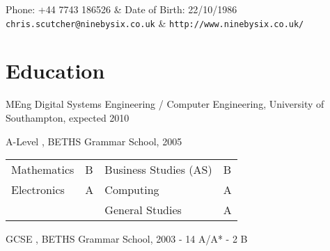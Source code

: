 \documentclass[overlapped,line,letterpaper]{res}
\begin{document}

\setlength{\leftmargini}{0em}
\setlength{\leftmargin}{1.5cm}
\setlength{\rightmargin}{1.5cm}
\setlength{\textheight}{800pt}
\setlength{\voffset}{-0.5in}
\renewcommand{\labelitemi}{}

\renewcommand{\namefont}{\large\textbf}



\begin{resume}

\begin{ncolumn}{2}  
  Phone: +44 7743 186526                & Date of Birth: 22/10/1986 \\		        
  {\tt chris.scutcher@ninebysix.co.uk}  & {\tt \verb+http://www.ninebysix.co.uk/+} 
\end{ncolumn}


\section{\bf Education}
MEng Digital Systems Engineering / Computer Engineering, University of 
Southampton, expected 2010

A-Level , BETHS Grammar School, 2005						\\ 
\hspace*{1cm} 
\begin{tabulary}{\textwidth}{p{4cm}p{0.5cm}p{4cm}p{0.5cm}}					   
Mathematics	&	B	&	Business Studies (AS)	&	B	\\ 
Electronics	&	A	&	Computing		&	A	\\ 
		&		&	General Studies		&	A	\\ 
\end{tabulary}

GCSE , BETHS Grammar School, 2003	- 14 A/A* - 2  B




\end{resume}
\end{document}
